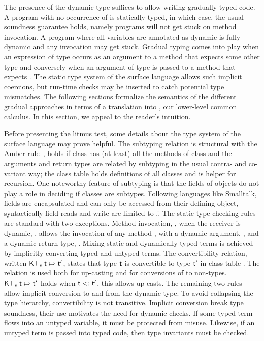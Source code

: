 \documentclass[USenglish]{tex/lipics-v2016}
\begin{document}
The presence of the dynamic type suffices to allow writing gradually typed
code. A program with no occurrence of \any is statically typed, in which
case, the usual soundness guarantee holds, namely programs will not get
stuck on method invocation. A program where all variables are annotated as
dynamic is fully dynamic and any invocation may get stuck.
Gradual typing comes into play when an expression of type \any occurs as an
argument to a method that expects some other type \C and conversely when an
argument of type \C is passed to a method that expects \any. The static type
system of the surface language allows such implicit coercions, but run-time
checks may be inserted to catch potential type mismatches. The following
sections formalize the semantics of the different gradual approaches in
terms of a translation into \kafka, our lower-level common calculus.  In
this section, we appeal to the reader's intuition.

Before presenting the litmus test, some details about the type system of the
surface language may prove helpful. The subtyping relation is structural
with the Amber rule~\cite{cardelli1985amber}, \StrSub\M\K\C\D holds if class
\C has (at least) all the methods of class \D and the arguments and return
types are related by subtyping in the usual contra- and co-variant way; the
class table \K holds definitions of all classes and \M is helper for
recursion. One noteworthy feature of subtyping is that the fields of objects
do not play a role in deciding if classes are subtypes. Following languages
like Smalltalk, fields are encapsulated and can only be accessed from their
defining object, syntactically field reads and write are limited to
\this.\f. The static type-checking rules are standard with two exceptions.
Method invocation, , when the receiver is dynamic,
\EM{\e:\any}, allows the invocation of any method \m, with a dynamic
argument, \EM{\ep:\any}, and a dynamic return type, .
Mixing static and dynamically typed terms is achieved by implicitly
converting typed and untyped terms. The convertibility relation, written
$\ConvertE\K s\t\tp$, states that type $\t$ is convertible to type $\tp$ in
class table \K.  The relation is used both for up-casting and for
conversions of \any to non-\any types.  $\ConvertE\K s\t\tp$ holds when
$\t\Sub\tp$, this allows up-casts. The remaining two rules allow implicit
conversion to and from the dynamic type.  To avoid collapsing the type
hierarchy, convertibility is not transitive. Implicit conversion break type
soundness, their use motivates the need for dynamic checks.  If some typed
term flows into an untyped variable, it must be protected from
misuse. Likewise, if an untyped term is passed into typed code, then type
invariants must be checked.
\end{document}
